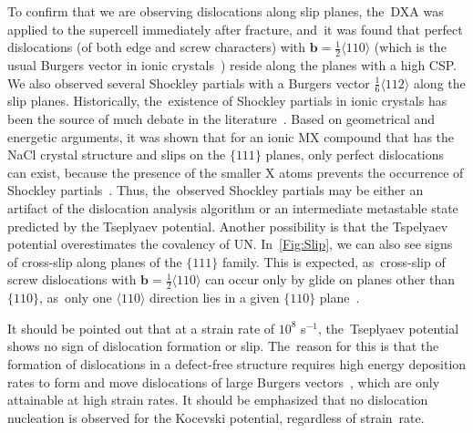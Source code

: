 \documentclass[applsci,article,accept,pdftex,moreauthors]{Definitions/mdpi}
\newcommand{\?}{\stackrel{?}{=}}
\begin{document}
To confirm that we are observing dislocations along slip planes, the~DXA was applied to the supercell immediately after fracture, and~it was found that perfect dislocations (of both edge and screw characters) with $\mathbf{b} = \frac{1}{2} \langle 110 \rangle$ (which is the usual Burgers vector in ionic crystals~\cite{Hull2011}) reside along the planes with a high CSP. We also observed several Shockley partials with a Burgers vector $\frac{1}{6}\langle112\rangle$ along the slip planes. Historically, the~existence of Shockley partials in ionic crystals has been the source of much debate in the \mbox{literature~\cite{Smoluchowski1966, Haasen1985}.} Based on geometrical and energetic arguments, it was shown that for an ionic MX compound that has the NaCl crystal structure and slips on the $\{111\}$ planes, only perfect dislocations can exist, because the presence of the smaller X atoms prevents the occurrence of Shockley partials~\cite{VanDerWalt1967}. Thus, the~observed Shockley partials may be either an artifact of the dislocation analysis algorithm or an intermediate metastable state predicted by the Tseplyaev potential. Another possibility is that the Tspelyaev potential overestimates the covalency of UN. In~\cref{Fig:Slip}, we can also see signs of cross-slip along planes of the $\{111\}$ family. This is expected, as~cross-slip of screw dislocations with $\mathbf{b} = \frac{1}{2}\langle110\rangle$ can occur only by glide on planes other than $\{110\}$, as~only one $\langle110\rangle$ direction lies in a given $\{110\}$ plane~\cite{Hull2011}.

It should be pointed out that at a strain rate of $10^{8}$ s$^{-1}$, the~Tseplyaev potential shows no sign of dislocation formation or slip. The~reason for this is that the formation of dislocations in a defect-free structure requires high energy deposition rates to form and move dislocations of large Burgers vectors~\cite{Desai2008, Pal2020}, which are only attainable at high strain rates. It should be emphasized that no dislocation nucleation is observed for the Kocevski potential, regardless of strain~rate.
\end{document}
